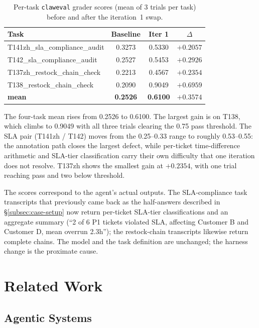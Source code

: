 \documentclass{article}
\begin{document}
\begin{table}[ht]
\caption{Per-task \texttt{claweval} grader scores (mean of 3 trials per task) before and after the iteration~1 swap.}
\label{tab:case-results}
\centering
\begin{tabular}{lccc}
\toprule
Task & Baseline & Iter 1 & $\Delta$ \\
\midrule
T141zh\_sla\_compliance\_audit  & 0.3273          & 0.5330          & $+0.2057$ \\
T142\_sla\_compliance\_audit    & 0.2527          & 0.5453          & $+0.2926$ \\
T137zh\_restock\_chain\_check   & 0.2213          & 0.4567          & $+0.2354$ \\
T138\_restock\_chain\_check     & 0.2090          & 0.9049          & $+0.6959$ \\
\midrule
\textbf{mean}                    & \textbf{0.2526} & \textbf{0.6100} & $\boldsymbol{+0.3574}$ \\
\bottomrule
\end{tabular}
\end{table}

The four-task mean rises from 0.2526 to 0.6100. The largest gain is on T138, which climbs to 0.9049 with all three trials clearing the 0.75 pass threshold. The SLA pair (T141zh / T142) moves from the 0.25--0.33 range to roughly 0.53--0.55: the annotation path closes the largest defect, while per-ticket time-difference arithmetic and SLA-tier classification carry their own difficulty that one iteration does not resolve. T137zh shows the smallest gain at $+0.2354$, with one trial reaching pass and two below threshold.

The scores correspond to the agent's actual outputs. The SLA-compliance task transcripts that previously came back as the half-answers described in \S\ref{subsec:case-setup} now return per-ticket SLA-tier classifications and an aggregate summary (``2 of 6 P1 tickets violated SLA, affecting Customer B and Customer D, mean overrun 2.3h''); the restock-chain transcripts likewise return complete chains. The model and the task definition are unchanged; the harness change is the proximate cause.


\section{Related Work}
\label{sec:related}

\subsection{Agentic Systems}
\label{subsec:related-agentic}
\end{document}
